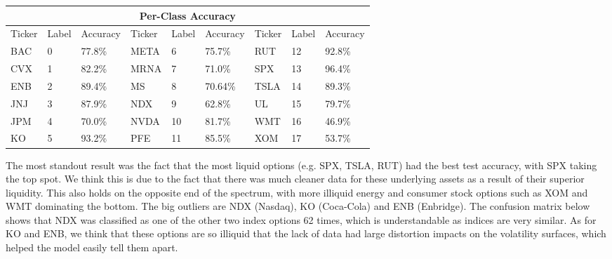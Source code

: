 \documentclass[10pt]{article}
\begin{document}
\begin{tabular}[H]{ |p{1.03cm}|p{1.03cm}|p{1.25cm}||p{1.03cm}|p{1.03cm}|p{1.25cm}||p{1.03cm}|p{1.03cm}|p{1.25cm}|  }
 \hline
 \multicolumn{9}{|c|}{Per-Class Accuracy} \\
 \hline
 Ticker & Label & Accuracy & Ticker & Label & Accuracy & Ticker & Label & Accuracy\\
 \hline
 BAC & 0 & 77.8\% & META & 6 & 75.7\% & RUT & 12 & 92.8\%\\
 CVX & 1 & 82.2\% & MRNA & 7 & 71.0\% & SPX & 13 & 96.4\% \\
 ENB & 2 & 89.4\% & MS & 8 & 70.64\% & TSLA & 14 & 89.3\%\\
 JNJ & 3 & 87.9\% & NDX & 9 & 62.8\% & UL & 15 & 79.7\%\\
 JPM & 4 & 70.0\% & NVDA & 10 & 81.7\% & WMT & 16 & 46.9\%\\
 KO & 5 & 93.2\% & PFE & 11 & 85.5\% & XOM & 17 & 53.7\% \\
 \hline
\end{tabular}

The most standout result was the fact that the most liquid options (e.g. SPX, TSLA, RUT) had the best test accuracy, with SPX taking the top spot. We think this is due to the fact that there was much cleaner data for these underlying assets as a result of their superior liquidity. This also holds on the opposite end of the spectrum, with more illiquid energy and consumer stock options such as XOM and WMT dominating the bottom. The big outliers are NDX (Nasdaq), KO (Coca-Cola) and ENB (Enbridge). The confusion matrix below shows that NDX was classified as one of the other two index options 62 times, which is understandable as indices are very similar. As for KO and ENB, we think that these options are so illiquid that the lack of data had large distortion impacts on the volatility surfaces, which helped the model easily tell them apart.
\end{document}
